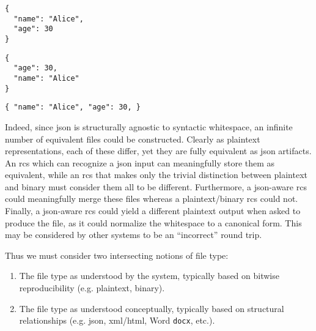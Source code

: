 \documentclass[twoside]{article}
\begin{document}
\begin{lstlisting}[style=listingcode]
{
  "name": "Alice",
  "age": 30
}
\end{lstlisting}

\begin{lstlisting}[style=listingcode]
{
  "age": 30,
  "name": "Alice"
}
\end{lstlisting}

\begin{lstlisting}[style=listingcode]
{ "name": "Alice", "age": 30, }
\end{lstlisting}

Indeed, since {\sc json} is structurally agnostic to syntactic whitespace, an infinite number of equivalent files could be constructed.  Clearly as plaintext representations, each of these differ, yet they are fully equivalent as {\sc json} artifacts.  An {\sc rcs} which can recognize a {\sc json} input can meaningfully store them as equivalent, while an {\sc rcs} that makes only the trivial distinction between plaintext and binary must consider them all to be different.  Furthermore, a {\sc json}-aware {\sc rcs} could meaningfully merge these files whereas a plaintext/binary {\sc rcs} could not.  Finally, a {\sc json}-aware {\sc rcs} could yield a different plaintext output when asked to produce the file, as it could normalize the whitespace to a canonical form.  This may be considered by other systems to be an ``incorrect'' round trip.

Thus we must consider two intersecting notions of file type:
\begin{enumerate}
  \item The file type as understood by the system, typically based on bitwise reproducibility (e.g. plaintext, binary).
  \item The file type as understood conceptually, typically based on structural relationships (e.g. {\sc json}, {\sc xml}/{\sc html}, Word \texttt{docx}, etc.).
\end{enumerate}
\end{document}
